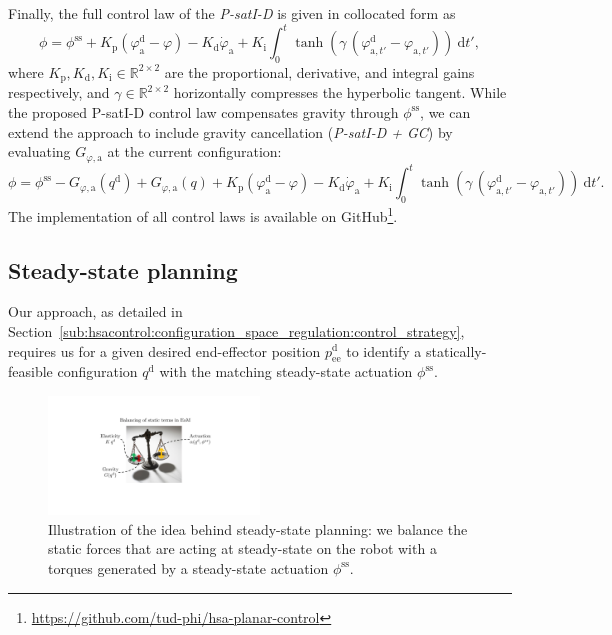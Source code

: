 % 
Finally, the full control law of the \emph{P-satI-D} is given in collocated form as
\begin{equation}\label{eq:hsacontrol:gravity_compensation_controller}
    \phi = \phi^\mathrm{ss} + K_\mathrm{p} (\varphi_\mathrm{a}^\mathrm{d} - \varphi) - K_\mathrm{d} \dot{\varphi}_\mathrm{a} + K_\mathrm{i} \int_0^t \tanh(\gamma \, ( \varphi_{\mathrm{a},t'}^\mathrm{d}-\varphi_{\mathrm{a},t'})) \: \mathrm{d} t',
\end{equation}
where $K_\mathrm{p}, K_\mathrm{d}, K_\mathrm{i} \in \mathbb{R}^{2 \times 2}$ are the proportional, derivative, and integral gains respectively, and $\gamma \in \mathbb{R}^{2 \times 2}$ horizontally compresses the hyperbolic tangent. While the proposed P-satI-D control law compensates gravity through $\phi^\mathrm{ss}$, we can extend the approach to include gravity cancellation (\emph{P-satI-D + GC}) by evaluating $G_{\varphi,\mathrm{a}}$ at the current configuration:
\begin{equation}\label{eq:hsacontrol:gravity_cancellation_controller}
    \phi = \phi^\mathrm{ss} - G_{\varphi,\mathrm{a}}(q^\mathrm{d}) + G_{\varphi,\mathrm{a}}(q) + K_\mathrm{p} (\varphi_\mathrm{a}^\mathrm{d} - \varphi) - K_\mathrm{d} \dot{\varphi}_\mathrm{a} + K_\mathrm{i} \int_0^t \tanh(\gamma \, ( \varphi_{\mathrm{a},t'}^\mathrm{d}-\varphi_{\mathrm{a},t'})) \: \mathrm{d} t'.
\end{equation}
The implementation of all control laws is available on GitHub\footnote{\url{https://github.com/tud-phi/hsa-planar-control}}.

\subsection{Steady-state planning}\label{sub:hsacontrol:experiments:steady_state_planning}
Our approach, as detailed in Section~\ref{sub:hsacontrol:configuration_space_regulation:control_strategy}, requires us for a given desired end-effector position $p_\mathrm{ee}^\mathrm{d}$ to identify a statically-feasible configuration $q^\mathrm{d}$ with the matching steady-state actuation $\phi^\mathrm{ss}$.

\begin{figure}[hbt]
    \centering
\includegraphics[width=0.5\textwidth]{hsacontrol/figures/control_schemes/configuration_space_regulation/steady_state_planning_cropped.pdf}
    \caption{Illustration of the idea behind steady-state planning: we balance the static forces that are acting at steady-state on the robot with a torques generated by a steady-state actuation $\phi^\mathrm{ss}$.}
    \label{fig:hsacontrol:configuration_space_regulation:steady_state_planning}
\end{figure}

